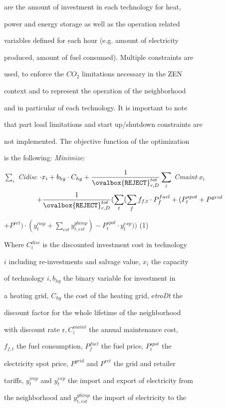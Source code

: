 \documentclass[a4paper,12pt]{article}
\begin{document}
are the amount of investment in each technology for heat,

power and energy storage as well as the operation related

variables defined for each hour (e.g. amount of electricity

produced, amount of fuel consumed). Multiple constraints are

used, to enforce the $CO_{2}$ limitations necessary in the ZEN

context and to represent the operation of the neighborhood

and in particular of each technology. It is important to note

that part load limitations and start up/shutdown constraints are

not implemented. The objective function of the optimization

is the following: {\it Minimize}:

$\displaystyle \sum_{\iota}$ {\it Cidisc} $\cdot x_{i}+b_{hg} \cdot C_{hg}+\displaystyle \frac{1}{\ovalbox{\tt\small REJECT}_{r,D}^{tot}}\sum_{\dot{\iota}}$ {\it Cmaint}$\cdot x_{i}$
$$
+\frac{1}{\ovalbox{\tt\small REJECT}_{r,D}^{tot}}(\sum_{t}(\sum_{f}f_{f,t}\cdot P_{f}^{fuel}+(P_{t}^{spot}+P^{grid}
$$
\begin{center}
$+P^{ret})\displaystyle \cdot(y_{t}^{imp}+\sum_{est}y_{t,e\overline{s}t}^{gbimp})-P_{t}^{spot}\cdot y_{t}^{exp}))$   (1)
\end{center}
Where $C_{i}^{disc}$ is the discounted investment cost in technology

$i$ including re-investments and salvage value, $x_{i}$ the capacity

of technology $i, b_{hg}$ the binary variable for investment in

a heating grid, $C_{hg}$ the cost of the heating grid, e{\it troDt} the

discount factor for the whole lifetime of the neighborhood

with discount rate $\mathrm{r}, C_{i}^{maint}$ the annual maintenance cost,

$f_{f,t}$ the fuel consumption, $P_{f}^{fuel}$ the fuel price, $P_{t}^{spot}$ the

electricity spot price, $P^{grid}$ and $P^{ret}$ the grid and retailer

tariffs, $y_{t}^{imp}$ and $y_{t}^{exp}$ the import and export of electricity from

the neighborhood and $y_{t,\overline{es}t}^{gbimp}$ the import of electricity to the
\end{document}
